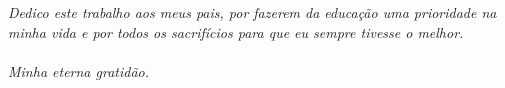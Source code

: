 \begin{dedicatoria}
\vspace*{\fill}
\centering
\noindent
\textit{
Dedico este trabalho aos meus pais, por fazerem da educação uma prioridade na minha vida e por todos os sacrifícios para que eu sempre tivesse o melhor.
\\ \\
Minha eterna gratidão.
}
\vspace*{\fill}
\end{dedicatoria}